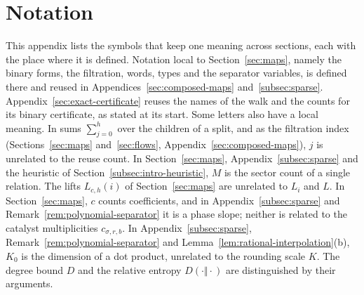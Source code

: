 \section{Notation}
\label{sec:notation}

{\small
This appendix lists the symbols that keep one meaning across sections,
each with the place where it is defined. Notation local to
Section~\ref{sec:maps}, namely the binary forms, the filtration, words,
types and the separator variables, is defined there and reused in
Appendices~\ref{sec:composed-maps} and~\ref{subsec:sparse}.
Appendix~\ref{sec:exact-certificate} reuses the names of the walk and the
counts for its binary certificate, as stated at its start. Some letters
also have a local meaning. In sums \(\sum_{j=0}^h\) over the children of
a split, and as the filtration index (Sections~\ref{sec:maps}
and~\ref{sec:flows}, Appendix~\ref{sec:composed-maps}), \(j\) is
unrelated to the reuse count. In Section~\ref{sec:maps},
Appendix~\ref{subsec:sparse} and the heuristic of
Section~\ref{subsec:intro-heuristic}, \(M\) is the sector count of a
single relation. The lifts \(L_{c,h}(i)\) of Section~\ref{sec:maps} are
unrelated to \(L_i\) and \(L\). In Section~\ref{sec:maps}, \(c\) counts
coefficients, and in Appendix~\ref{subsec:sparse} and
Remark~\ref{rem:polynomial-separator} it is a phase slope; neither is
related to the catalyst multiplicities \(c_{\sigma,r,b}\). In
Appendix~\ref{subsec:sparse}, Remark~\ref{rem:polynomial-separator} and
Lemma~\ref{lem:rational-interpolation}(b), \(K_0\) is the dimension of
a dot product, unrelated to the rounding scale \(K\). The
degree bound \(D\) and the relative entropy \(D(\cdot\Vert\cdot)\) are
distinguished by their arguments.

}
